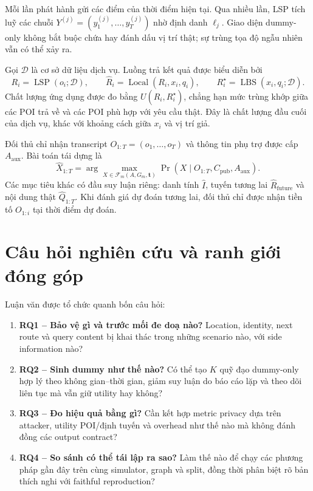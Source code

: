 \documentclass[12pt,a4paper,oneside]{report}
\begin{document}
Mỗi lần phát hành gửi các điểm của thời điểm hiện tại. Qua nhiều lần, LSP tích luỹ các chuỗi $Y^{(j)}=(y_1^{(j)},\ldots,y_T^{(j)})$ nhờ định danh $\ell_j$. Giao diện dummy-only không bắt buộc chứa hay đánh dấu vị trí thật; sự trùng tọa độ ngẫu nhiên vẫn có thể xảy ra.

Gọi $\mathcal D$ là cơ sở dữ liệu dịch vụ. Luồng trả kết quả được biểu diễn bởi
\[
R_i=\operatorname{LSP}(o_i;\mathcal D),\qquad
\widehat R_i=\operatorname{Local}(R_i,x_i,q_i),\qquad
R_i^\star=\operatorname{LBS}(x_i,q_i;\mathcal D).
\]
Chất lượng ứng dụng được đo bằng $U(\widehat R_i,R_i^\star)$, chẳng hạn mức trùng khớp giữa các POI trả về và các POI phù hợp với yêu cầu thật. Đây là chất lượng đầu cuối của dịch vụ, khác với khoảng cách giữa $x_i$ và vị trí giả.

Đối thủ chỉ nhận transcript $O_{1:T}=(o_1,\ldots,o_T)$ và thông tin phụ trợ được cấp $A_{\mathrm{aux}}$. Bài toán tái dựng là
\[
\widehat X_{1:T}
=\arg\max_{X\in\mathcal F_m(A,G_m,\mathbf t)}
\Pr(X\mid O_{1:T},C_{\mathrm{pub}},A_{\mathrm{aux}}).
\]
Các mục tiêu khác có đầu suy luận riêng: danh tính $\widehat I$, tuyến tương lai $\widehat R_{\mathrm{future}}$ và nội dung thật $\widehat Q_{1:T}$. Khi đánh giá dự đoán tương lai, đối thủ chỉ được nhận tiền tố $O_{1:i}$ tại thời điểm dự đoán.

\section{Câu hỏi nghiên cứu và ranh giới đóng góp}

Luận văn được tổ chức quanh bốn câu hỏi:

\begin{enumerate}
  \item \textbf{RQ1 -- Bảo vệ gì và trước mối đe doạ nào?} Location, identity, next route và query content bị khai thác trong những scenario nào, với side information nào?
  \item \textbf{RQ2 -- Sinh dummy như thế nào?} Có thể tạo $K$ quỹ đạo dummy-only hợp lý theo không gian--thời gian, giảm suy luận do báo cáo lặp và theo dõi liên tục mà vẫn giữ utility hay không?
  \item \textbf{RQ3 -- Đo hiệu quả bằng gì?} Cần kết hợp metric privacy dựa trên attacker, utility POI/định tuyến và overhead như thế nào mà không đánh đồng các output contract?
  \item \textbf{RQ4 -- So sánh có thể tái lập ra sao?} Làm thế nào để chạy các phương pháp gần đây trên cùng simulator, graph và split, đồng thời phân biệt rõ bản thích nghi với faithful reproduction?
\end{enumerate}
\end{document}

